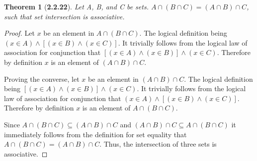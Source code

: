 \documentclass[a4paper, 12pt]{article}
\theoremstyle{plain}
\newtheorem*{theorem*}{Theorem}
\begin{document}
	
	\begin{theorem*}[\textbf{2.2.22}]
		Let A, B, and C be sets. $A \cap (B \cap C) = (A \cap B) \cap C$, such that set 
		intersection is associative.
	\end{theorem*}
	
	\begin{proof}
		Let $x$ be an element in $A \cap (B \cap C)$. The logical definition being \newline 
		$(x \in A) \land [(x \in B) \land (x \in C)]$. It trivially follows from the logical 
		law of association for conjunction that $[(x \in A) \land (x \in B)] \land (x \in C)$. 
		Therefore by definition $x$ is an element of $(A \cap B) \cap C$.
		
		Proving the converse, let $x$ be an element in $(A \cap B) \cap C$. The logical 
		definition being $[(x \in A) \land (x \in B)] \land (x \in C)$. It trivially follows 
		from the logical law of association for conjunction that \newline 
		$(x \in A) \land [(x \in B) \land (x \in C)]$. Therefore by definition $x$ is an element of 
		$A \cap (B \cap C)$.
		
		Since $A \cap (B \cap C) \subseteq (A \cap B) \cap C$ and 
		$(A \cap B) \cap C \subseteq A \cap (B \cap C)$ it immediately follows from the definition 
		for set equality that \newline $A \cap (B \cap C) = (A \cap B) \cap C$. Thus, the 
		intersection of three sets is associative.
	\end{proof}
\end{document}
